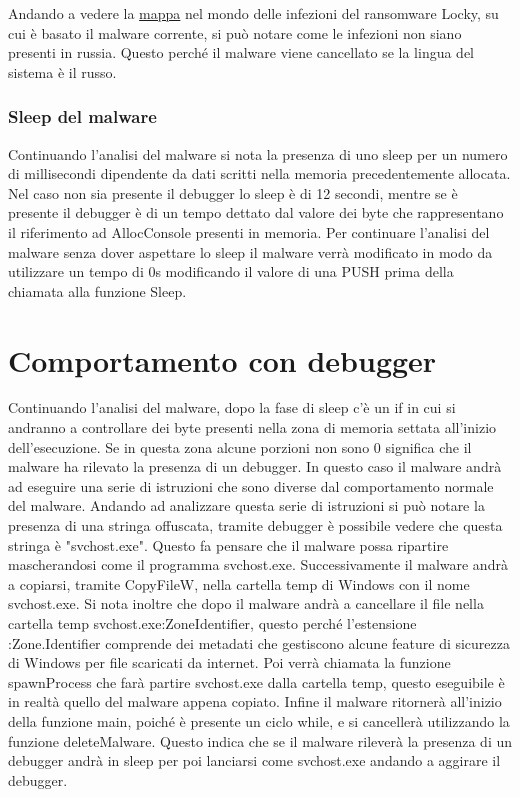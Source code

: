 \documentclass[a4paper,12pt]{article}
\begin{document}
Andando a vedere la \href{https://www.enterprisetimes.co.uk/2017/09/27/another-wave-locky-ransomware-arrives/}{mappa} nel mondo delle infezioni del ransomware Locky, su cui è basato il malware corrente, si può notare come le infezioni non siano presenti in russia. Questo perché il malware viene cancellato se la lingua del sistema è il russo.

\subsubsection{Sleep del malware}
Continuando l'analisi del malware si nota la presenza di uno sleep per un numero di millisecondi dipendente da dati scritti nella memoria precedentemente allocata. Nel caso non sia presente il debugger lo sleep è di 12 secondi, mentre se è presente il debugger è di un tempo dettato dal valore dei byte che rappresentano il riferimento ad AllocConsole presenti in memoria. 
Per continuare l'analisi del malware senza dover aspettare lo sleep il malware verrà modificato in modo da utilizzare un tempo di 0s modificando il valore di una PUSH prima della chiamata alla funzione Sleep. 

\section{Comportamento con debugger}
Continuando l'analisi del malware, dopo la fase di sleep c'è un if in cui si andranno a controllare dei byte presenti nella zona di memoria settata all'inizio dell'esecuzione. Se in questa zona alcune porzioni non sono 0 significa che il malware ha rilevato la presenza di un debugger. In questo caso il malware andrà ad eseguire una serie di istruzioni che sono diverse dal comportamento normale del malware. Andando ad analizzare questa serie di istruzioni si può notare la presenza di una stringa offuscata, tramite debugger è possibile vedere che questa stringa è "svchost.exe". Questo fa pensare che il malware possa ripartire mascherandosi come il programma svchost.exe. 
Successivamente il malware andrà a copiarsi, tramite CopyFileW, nella cartella temp di Windows con il nome svchost.exe.
Si nota inoltre che dopo il malware andrà a cancellare il file nella cartella temp svchost.exe:ZoneIdentifier, questo perché l'estensione :Zone.Identifier comprende dei metadati che gestiscono alcune feature di sicurezza di Windows per file scaricati da internet. 
Poi verrà chiamata la funzione spawnProcess che farà partire svchost.exe dalla cartella temp, questo eseguibile è in realtà quello del malware appena copiato.  Infine il malware ritornerà all'inizio della funzione main, poiché è presente un ciclo while, e si cancellerà utilizzando la funzione deleteMalware. Questo indica che se il malware rileverà la presenza di un debugger andrà in sleep per poi lanciarsi come svchost.exe andando a aggirare il debugger.
\end{document}
